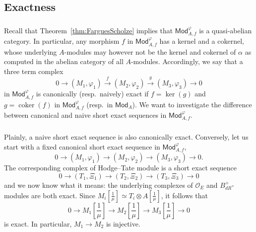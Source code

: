 \documentclass[11pt]{article}
\theoremstyle{definition}
\numberwithin{equation}{section}
\numberwithin{figure}{section}
\numberwithin{table}{section}
\newcommand{\Mod}{\mathsf{Mod}}
\DeclareMathOperator{\coker}{coker}
\newcommand*{\dR}{dR}
\begin{document}
\subsection{Exactness}\label{subsec:Exactness}

\subsubsection{}

Recall that Theorem~\ref{thm:FarguesScholze} implies that $\Mod_{A,f}^{\varphi}$ is a quasi-abelian category. In particular, any morphism $f$ in $\Mod_{A,f}^{\varphi}$ has a kernel and a cokernel, whose underlying $A$-modules may however not be the kernel and cokernel of $\alpha$ as computed in the abelian category of all $A$-modules. Accordingly, we say that a three term complex
\[
0\rightarrow(M_{1},\varphi_{1})\stackrel{f}{\longrightarrow}(M_{2},\varphi_{2})\stackrel{g}{\longrightarrow}(M_{3},\varphi_{3})\rightarrow0
\]
in $\Mod_{A,f}^{\varphi}$ is canonically (resp.~naively) exact if $f=\ker(g)$ and $g=\coker(f)$ in $\Mod_{A,f}^{\varphi}$ (resp.~in $\Mod_{A}$). We want to investigate the difference between canonical and naive short exact sequences in $\Mod_{A,f}^{\varphi}$.

\subsubsection{}

Plainly, a naive short exact sequence is also canonically exact. Conversely, let us start with a fixed canonical short exact sequence in $\Mod_{A,f}^{\varphi}$,
\[
0\rightarrow(M_{1},\varphi_{1})\rightarrow(M_{2},\varphi_{2})\rightarrow(M_{3},\varphi_{3})\rightarrow0.
\]
The corresponding complex of Hodge--Tate module is a short exact sequence
\[
0\rightarrow(T_{1},\Xi_{1})\rightarrow(T_{2},\Xi_{2})\rightarrow(T_{3},\Xi_{3})\rightarrow0
\]
and we now know what it means: the underlying complexes of $\mathcal{O}_{E}$ and $B_{\dR}^{+}$-modules are both exact. Since $M_{i}[\frac{1}{\mu}]\simeq T_{i}\otimes A[\frac{1}{\mu}]$, it follows that
\[
0\rightarrow M_{1}\!\left[{\frac{1}{\mu}}\right]\rightarrow M_{2}\!\left[{\frac{1}{\mu}}\right]\rightarrow M_{3}\!\left[{\frac{1}{\mu}}\right]\rightarrow0
\]
is exact. In particular, $M_{1}\rightarrow M_{2}$ is injective.

\subsubsection{}
\end{document}
